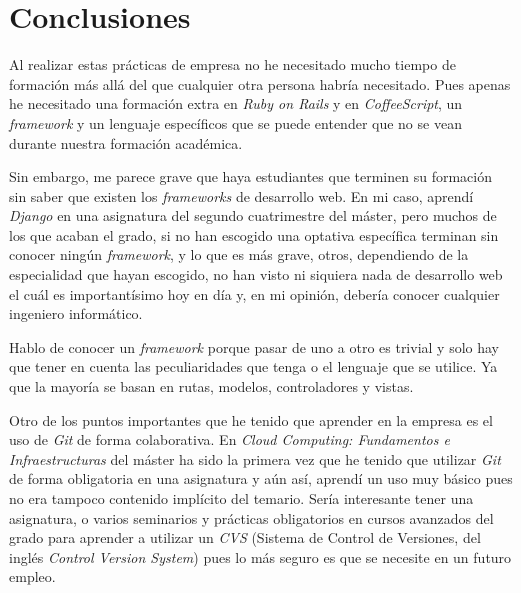 \chapter{Conclusiones}

Al realizar estas prácticas de empresa no he necesitado mucho tiempo de formación más allá del que cualquier otra persona habría necesitado. Pues apenas he necesitado una formación extra en \textit{Ruby on Rails} y en \textit{CoffeeScript}, un \textit{framework} y un lenguaje específicos que se puede entender que no se vean durante nuestra formación académica.

Sin embargo, me parece grave que haya estudiantes que terminen su formación sin saber que existen los \textit{frameworks} de desarrollo web. En mi caso, aprendí \textit{Django} en una asignatura del segundo cuatrimestre del máster, pero muchos de los que acaban el grado, si no han escogido una optativa específica terminan sin conocer ningún \textit{framework}, y lo que es más grave, otros, dependiendo de la especialidad que hayan escogido, no han visto ni siquiera nada de desarrollo web el cuál es importantísimo hoy en día y, en mi opinión, debería conocer cualquier ingeniero informático.

Hablo de conocer un \textit{framework} porque pasar de uno a otro es trivial y solo hay que tener en cuenta las peculiaridades que tenga o el lenguaje que se utilice. Ya que la mayoría se basan en rutas, modelos, controladores y vistas.

Otro de los puntos importantes que he tenido que aprender en la empresa es el uso de \textit{Git} de forma colaborativa. En \textit{Cloud Computing: Fundamentos e Infraestructuras} del máster ha sido la primera vez que he tenido que utilizar \textit{Git} de forma obligatoria en una asignatura y aún así, aprendí un uso muy básico pues no era tampoco contenido implícito del temario. Sería interesante tener una asignatura, o varios seminarios y prácticas obligatorios en cursos avanzados del grado para aprender a utilizar un \textit{CVS} (Sistema de Control de Versiones, del inglés \textit{Control Version System}) pues lo más seguro es que se necesite en un futuro empleo.